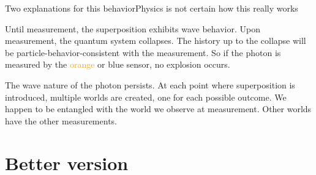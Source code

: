 \begin{frame}{Two explanations for this behavior}{Physics is not certain how this really works}
  \begin{description}
     \item<1->[\href{https://en.wikipedia.org/wiki/Copenhagen_interpretation}{Copenhagen}] Until measurement, the superposition exhibits wave behavior.  Upon measurement, the quantum system collapses.  The history up to the collapse will be particle-behavior-consistent with the measurement.  So if the photon is measured by the \textcolor{orange}{orange} or
     \textcolor{\RCtwo}{blue} sensor, no explosion occurs.
     \item<2>[\href{https://en.wikipedia.org/wiki/Many-worlds_interpretation}{Many worlds}] The wave nature of the photon persists.  At each point where superposition is introduced, multiple worlds are created, one for each possible outcome.  We happen to be entangled with the world we observe at measurement.  Other worlds have the other measurements.
  \end{description}
  
\end{frame}

\section{Better version}


